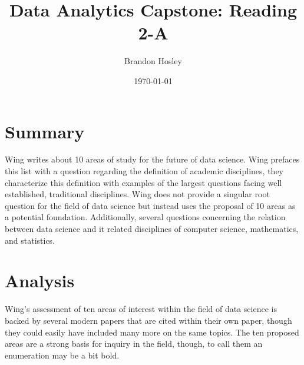 \documentclass[]{article}
\title{Data Analytics Capstone: Reading 2-A}
\author{Brandon Hosley}
\date{\today}
\begin{document}
	\maketitle
	
\section{Summary} 

Wing \cite{Wing2020} writes about 10 areas of study for the future of data science.
Wing prefaces this list with a question regarding the definition of academic disciplines,
they characterize this definition with examples of the largest questions facing well established, traditional disciplines.
Wing does not provide a singular root question for the field of data science but instead uses the proposal of 10 areas as a potential foundation.
Additionally, several questions concerning the relation between data science and it related disciplines of computer science, mathematics, and statistics.

\section{Analysis}

Wing's assessment of ten areas of interest within the field of data science is backed by several modern papers that are cited within their own paper, though they could easily have included many more on the same topics.
The ten proposed areas are a strong basis for inquiry in the field, though, to call them an enumeration may be a bit bold.


\clearpage


\end{document}
